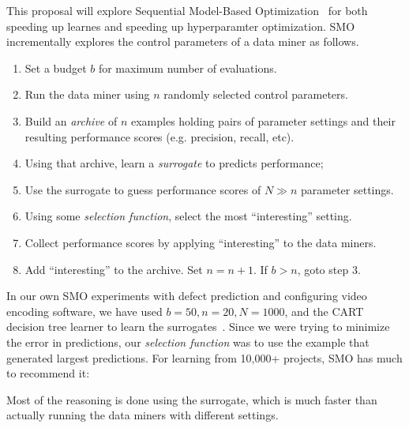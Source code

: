 This proposal will explore Sequential Model-Based Optimization~\cite{Bergstra:2011} for both speeding up learnes and speeding
up hyperparamter optimization.
SMO  incrementally explores the control parameters of a data miner as follows.
\begin{enumerate}
\item Set a budget $b$ for maximum number of evaluations.
\item
Run the data miner using $n$ randomly selected control parameters.
\item Build an {\em archive} of  $n$   examples holding pairs of  parameter settings and   their resulting performance scores
(e.g. precision, recall, etc).
\item
Using that archive, learn a {\em surrogate}   to predicts performance;
\item Use the surrogate to guess  performance scores of 
$N \gg n$ parameter settings.
\item Using some {\em selection  function}, select  the most ``interesting'' setting. 
\item Collect performance scores by applying    ``interesting'' to the data miners. 
\item  Add  ``interesting'' to the archive. Set $n=n+1$. If $b>n$, goto step 3.
\end{enumerate}
In our own SMO  experiments with defect prediction and configuring video encoding software, we have used $b=50,n=20, N=1000$, and the CART
decision tree learner to learn the surrogates~\cite{nair18tse}. Since we were trying to minimize the error in predictions,
our {\em selection function} was to use the example that generated largest predictions.
For learning from 10,000+ projects, SMO has much to recommend it:
\bi
\item
Most of the reasoning is done using the surrogate, which is much faster than actually running the data miners with different settings.

